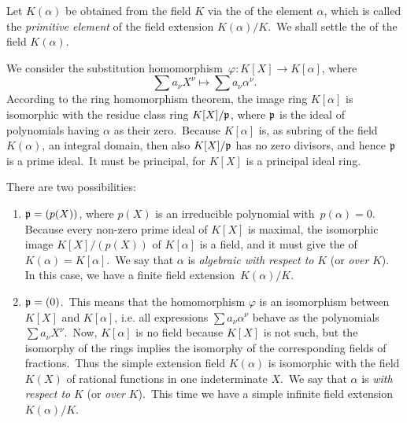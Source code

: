 \documentclass[12pt]{article}
\begin{document}
Let $K(\alpha)$ be obtained from the field $K$ via the  of the element $\alpha$, which is called the \emph{primitive element} of the field extension $K(\alpha)/K$.\, We shall settle the  of the field $K(\alpha)$.

We consider the substitution homomorphism \,$\varphi: K[X] \rightarrow K[\alpha]$, where
            $$\sum a_{\nu}X^\nu \mapsto \sum a_{\nu}\alpha^\nu.$$
According to the ring homomorphism theorem, the image ring $K[\alpha]$ is isomorphic with the residue class ring $K[X]/\frak{p}$, where $\frak{p}$ is the ideal of polynomials having $\alpha$ as their zero. \,Because $K[\alpha]$ is, as subring of the field $K(\alpha)$, an integral domain, then also $K[X]/\frak{p}$ has no zero divisors, and hence $\frak{p}$ is a prime ideal. \,It must be principal, for $K[X]$ is a principal ideal ring.

There are two possibilities:

\begin{enumerate}
\item  $\frak{p} = (p(X))$, where $p(X)$ is an irreducible polynomial with \,$p(\alpha) = 0$. \,Because every non-zero prime ideal of $K[X]$ is maximal, the isomorphic image $K[X]/(p(X))$ of $K[\alpha]$ is a field, and it must give the  of \,$K(\alpha) = K[\alpha]$. \,We say that $\alpha$ is {\em algebraic with respect to} $K$ (or {\em over} $K$). \,In this case, we have a finite field extension \,$K(\alpha)/K$.

\item  $\frak{p} = (0)$. \,This means that the homomorphism $\varphi$ is an isomorphism between $K[X]$ and $K[\alpha]$, i.e. all expressions $\sum a_{\nu}\alpha^\nu$ behave as the polynomials $\sum a_{\nu}X^\nu$. \,Now, $K[\alpha]$ is no field because $K[X]$ is not such, but the isomorphy of the rings implies the isomorphy of the corresponding fields of fractions. \,Thus the simple extension field $K(\alpha)$ is isomorphic with the field $K(X)$ of rational functions in one indeterminate $X$. \,We say that $\alpha$ is {\em {} with respect to} $K$ (or {\em over} $K$).  \,This time we have a simple infinite field extension \,$K(\alpha)/K$. 
\end{enumerate}
\end{document}
